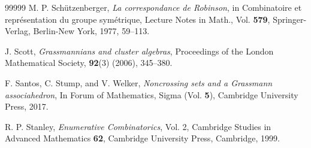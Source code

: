 \documentclass[12pt, reqno]{amsart}
\theoremstyle{plain}
\theoremstyle{definition}
\numberwithin{equation}{section}
\begin{document}
\begin{thebibliography}{99999}
 M. P. Sch\"{u}tzenberger, \textit{La correspondance de Robinson}, in Combinatoire et repr\'{e}sentation du groupe sym\'{e}trique, Lecture Notes in Math., Vol. \textbf{579}, Springer-Verlag, Berlin-New York, 1977, 59--113. 

 J. Scott, \textit{Grassmannians and cluster algebras}, Proceedings of the London Mathematical Society, \textbf{92}(3) (2006), 345--380. 

 F. Santos, C. Stump, and V. Welker, \textit{Noncrossing sets and a Grassmann associahedron}, In Forum of Mathematics, Sigma (Vol. \textbf{5}), Cambridge University Press, 2017.

 R. P. Stanley, \textit{Enumerative Combinatorics}, Vol. 2, Cambridge Studies in Advanced Mathematics \textbf{62}, Cambridge University Press, Cambridge, 1999.
 
\end{thebibliography} 
\end{document}
